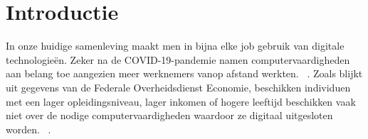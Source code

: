 
\section{Introductie}%
\label{sec:introductie}








In onze huidige samenleving maakt men in bijna elke job gebruik van digitale technologieën. Zeker na de COVID-19-pandemie namen computervaardigheden aan belang toe aangezien meer werknemers vanop afstand werkten. ~\autocite{NBERw27422}. Zoals blijkt uit gegevens van de Federale Overheidsdienst Economie, beschikken individuen met een lager opleidingsniveau, lager inkomen of hogere leeftijd beschikken vaak niet over de nodige computervaardigheden waardoor ze digitaal uitgesloten worden. ~\autocite{FederalPublicServiceEconomyKloof}.

